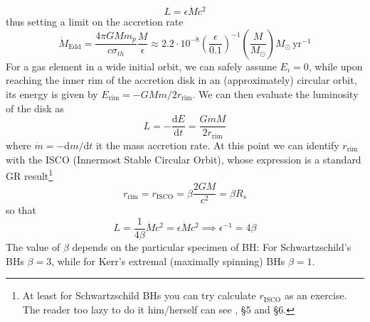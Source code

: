 \begin{equation*}
    L = \epsilon \dot{M} c^{2}
\end{equation*}
thus setting a limit on the accretion rate
\begin{equation*}
    \dot{M}_{\text{Edd}} = \frac{4\pi GMm_{p}}{c\sigma_{th}}\frac{M}{\epsilon}\approx 2.2\cdot 10^{-8}\left(\frac{\epsilon}{0.1}\right)^{-1}\left(\frac{M}{M_{\odot}}\right)M_{\odot}\,\text{yr}^{-1}
\end{equation*}
For a gas element in a wide initial orbit, we can safely assume $E_{i} = 0$, while upon reaching the inner rim of the accretion disk in an (approximately) circular orbit, its energy is given by $E_{\text{rim}}=-GMm/2r_{\text{rim}}$. We can then evaluate the luminosity of the disk as
\begin{equation*}
    L = -\frac{\text{d}E}{\text{d}t} = \frac{G\dot{m}M}{2r_{\text{rim}}}
\end{equation*}
where $\dot{m} = -\text{d}m/\text{d}t$ it the mass accretion rate. At this point we can identify $r_{\text{rim}}$ with the ISCO (Innermost Stable Circular Orbit), whose expression is a standard GR result\footnote{At least for Schwartzschild BHs you can try calculate $r_{\text{ISCO}}$ as an exercise. The reader too lazy to do it him/herself can see \cite{carroll}, §5 and §6.}
\begin{equation*}
    r_{\text{rim}} = r_{\text{ISCO}} = \beta\frac{2GM}{c^{2}} = \beta R_{s}
\end{equation*}
so that
\begin{equation*}
    L = \frac{1}{4\beta} \dot{M}c^{2} = \epsilon \dot{M}c^{2} \implies \epsilon^{-1} = 4\beta
\end{equation*}
The value of $\beta$ depends on the particular specimen of BH: For Schwartzschild's BHs $\beta = 3$, while for Kerr's extremal (maximally spinning) BHs $\beta = 1$.
